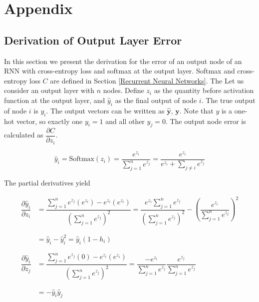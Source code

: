 \documentclass[pageno]{final_paper}
\begin{document}
\newpage
{}


\newpage

\section{Appendix}
\label{Appendix}

\subsection{Derivation of Output Layer Error}
\label{Derivation of Output Layer Error}

In this section we present the derivation for the error of an output node of an
RNN with cross-entropy loss and softmax at the output layer. Softmax and
cross-entropy loss $C$ are defined in Section \ref{Recurrent Neural Networks}.
The Let us consider an output layer with $n$ nodes. Define $z_i$ as the quantity
before activation function at the output layer, and $\hat{y}_i$ as the final
output of node $i$. The true output of node $i$ is $y_i$. The output vectors can
be written as $\mathbf{\hat{y}},\,\mathbf{y}$. Note that $y$ is a one-hot
vector, so exactly one $y_i = 1$ and all other $y_j = 0$. The output node error
is calculated as $\dfrac{\partial C}{\partial z_i}$.

\begin{equation}
    \label{eq: output layer value}
    \hat{y}_i = \text{Softmax}(z_i) = \dfrac{e^{z_i}}{\sum\limits_{j=1}^n e^{z_j}} = \dfrac{e^{z_i}}
    {e^{z_i} + \sum\limits_{j\neq i} e^{z_j}}
\end{equation}

The partial derivatives yield

\begin{equation}
    \label{eq: output partials}
    \begin{aligned}
        \dfrac{\partial \hat{y}_i}{\partial z_i} &= \dfrac{\sum\limits_{j=1}^n e^{z_j}(e^{z_i}) - e^{z_i}(e^{z_i})}
        {\left( \sum\limits_{j=1}^n e^{z_j} \right)^2}
        = \dfrac{e^{z_i}\sum\limits_{j=1}^n e^{z_j}}{\left( \sum\limits_{j=1}^n e^{z_j} \right)^2}
        - \left( \dfrac{e^{z_i}}{ \sum\limits_{j=1}^n e^{z_j} } \right)^2 \\
        &\phantom{=} \\
        &= \hat{y}_i - \hat{y}_i^2
        = \hat{y}_i\left( 1 - h_i \right) \\
        &\phantom{=} \\
        \dfrac{\partial \hat{y}_i}{\partial z_j} &= \dfrac{\sum\limits_{j=1}^n e^{z_j}(0) - e^{z_i}(e^{z_i})}
        {\left( \sum\limits_{j=1}^n e^{z_j} \right)^2}
        = \dfrac{-e^{z_i}}{\sum\limits_{j=1}^n e^{z_j}}\dfrac{e^{z_j}}{\sum\limits_{j=1}^n e^{z_j}} \\
        &\phantom{=} \\
        &= -\hat{y}_i\hat{y}_j
    \end{aligned}
\end{equation}
\end{document}
